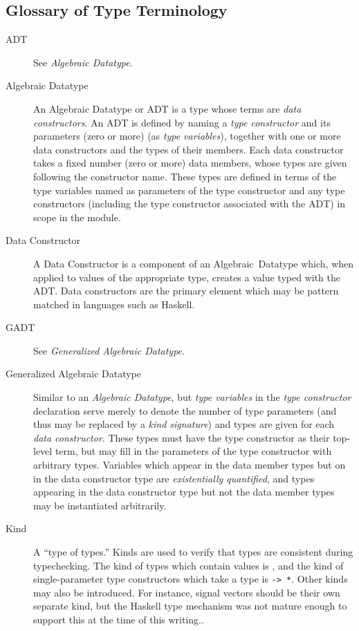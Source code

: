\begin{code}
\chapter{Glossary of Type Terminology}
\label{chapter:Haskell_Concepts-Glossary_of_Type_Terminology}
\begin{description}
\item[ADT] See {\em Algebraic Datatype}.

\item[Algebraic Datatype] An Algebraic Datatype or ADT is a type whose terms
are {\em data constructors}. An ADT is defined by naming a
{\em type constructor} and its parameters (zero or more)
(as {\em type variables}), together with one or more data constructors and the
types of their members. Each data constructor takes a fixed number
(zero or more) data members, whose types are given following the constructor
name. These types are defined in terms of the type variables named as parameters
of the type constructor and any type constructors (including the type
constructor associated with the ADT) in scope in the module.

\item[Data Constructor] A Data Constructor is a component of an
Algebraic~Datatype which, when applied to values of the appropriate type, 
creates a value typed with the ADT. Data constructors are the primary element
which may be pattern matched in languages such as Haskell.

\item[GADT] See {\em Generalized Algebraic Datatype}.

\item[Generalized Algebraic Datatype] Similar to an {\em Algebraic Datatype},
but {\em type variables} in the {\em type constructor} declaration serve merely
to denote the number of type parameters (and thus may be replaced by a
{\em kind signature}) and types are given for each {\em data constructor}. These
types must have the type constructor as their top-level term, but may fill in
the parameters of the type constructor with arbitrary types. Variables which
appear in the data member types but on in the data constructor type are
{\em existentially quantified}, and types appearing in the data constructor
type but not the data member types may be instantiated arbitrarily.

\item[Kind] A ``type of types.'' Kinds are used to verify that types are
consistent during typechecking. The kind of types which contain values is
{\tt *}, and the kind of single-parameter type constructors which take a
type is {\tt * -> *}. Other kinds may also be introduced. For instance,
signal vectors should be their own separate kind, but the Haskell type mechanism
was not mature enough to support this at the time of this writing..


\end{description}
\end{code}

